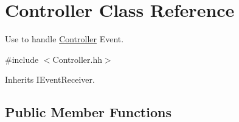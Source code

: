 \hypertarget{classController}{}\section{Controller Class Reference}
\label{classController}


Use to handle \hyperlink{classController}{Controller} Event.  




{\ttfamily \#include $<$Controller.\+hh$>$}



Inherits I\+Event\+Receiver.

\subsection*{Public Member Functions}
